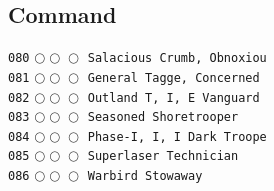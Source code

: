 \documentclass[a4paper,landscape]{article}
\begin{document}
\begin{multicols*}{5}
\section{Command} 
\vspace{-2mm} 
\texttt{080} \(\bigcirc\!\bigcirc\!\bigcirc\)  \texttt{Salacious Crumb, Obnoxiou} \vspace{-0.3mm}\\ 
\texttt{081} \(\bigcirc\!\bigcirc\!\bigcirc\)  \texttt{General Tagge, Concerned } \vspace{-0.3mm}\\ 
\texttt{082} \(\bigcirc\!\bigcirc\!\bigcirc\)  \texttt{Outland T, I, E Vanguard} \vspace{-0.3mm}\\ 
\texttt{083} \(\bigcirc\!\bigcirc\!\bigcirc\)  \texttt{Seasoned Shoretrooper} \vspace{-0.3mm}\\ 
\texttt{084} \(\bigcirc\!\bigcirc\!\bigcirc\)  \texttt{Phase-I, I, I Dark Troope} \vspace{-0.3mm}\\ 
\texttt{085} \(\bigcirc\!\bigcirc\!\bigcirc\)  \texttt{Superlaser Technician} \vspace{-0.3mm}\\ 
\texttt{086} \(\bigcirc\!\bigcirc\!\bigcirc\)  \texttt{Warbird Stowaway} \vspace{-0.3mm}\\ 

\end{multicols*}
\end{document}
